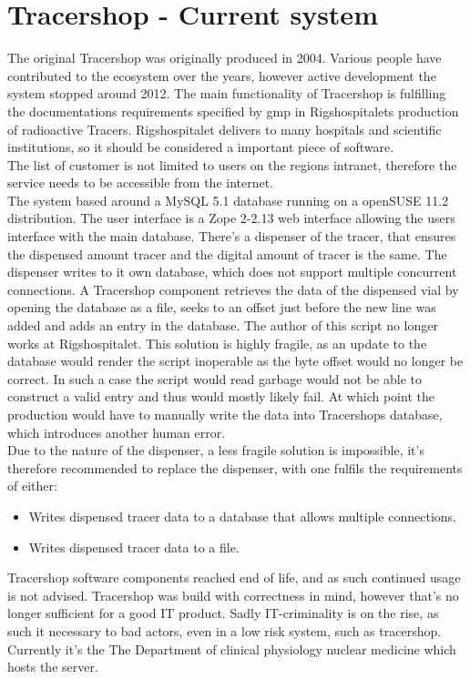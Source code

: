 \documentclass{article}
\begin{document}
\section*{Tracershop - Current system}
The original Tracershop was originally produced in 2004. Various people have contributed to the ecosystem over the years,
however active development the system stopped around 2012.
The main functionality of Tracershop is fulfilling the documentations requirements specified by \gls{gmp} in Rigshospitalets production of radioactive Tracers.
Rigshospitalet delivers to many hospitals and scientific institutions,
so it should be considered a important piece of software.\\
The list of customer is not limited to users on the regions intranet, therefore the service needs to be accessible from the internet.\\
The system based around a MySQL 5.1 database running on a openSUSE 11.2 distribution.
The user interface is a  Zope 2-2.13 web interface allowing the users interface with the main database.
There's a dispenser of the tracer, that ensures the dispensed amount tracer and the digital amount of tracer is the same.
The dispenser writes to it own database, which does not support multiple concurrent connections.
A Tracershop component retrieves the data of the dispensed vial by opening the database as a file, seeks to an offset just before the new line was added and
adds an entry in the database. The author of this script no longer works at Rigshospitalet. This solution is highly fragile, as an update to the database would
render the script inoperable as the byte offset would no longer be correct.
In such a case the script would read garbage would not be able to construct a valid entry and thus would mostly likely fail.
At which point the production would have to manually write the data into Tracershops database, which introduces another human error.\\
Due to the nature of the dispenser, a less fragile solution is impossible, it's therefore recommended to replace the dispenser, with one fulfils the requirements of either:
\begin{itemize}
  \item Writes dispensed tracer data to a database that allows multiple connections.
  \item Writes dispensed tracer data to a file.
\end{itemize}
Tracershop software components reached end of life, and as such continued usage is not advised. Tracershop was build with correctness in mind,
however that's no longer sufficient for a good IT product. Sadly IT-criminality is on the rise, as such it necessary to bad actors, even in a low risk system,
such as tracershop.\\
Currently it's the The Department of clinical physiology nuclear medicine which hosts the server.
\end{document}
